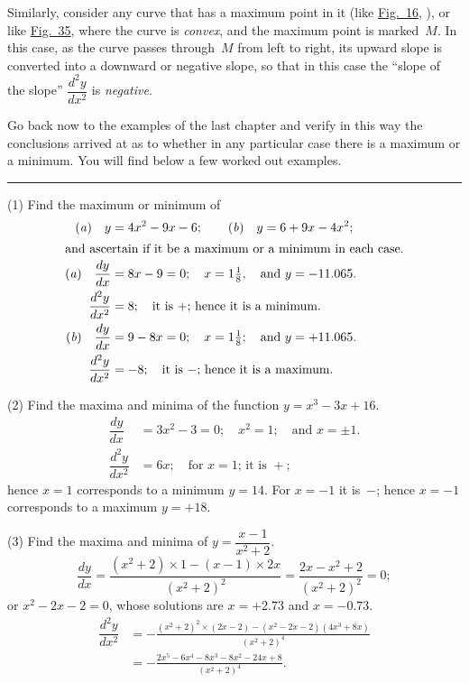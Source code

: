 \documentclass[12pt]{book}[2005/09/16]
\newcommand{\DPPageSep}[2]{\Pagelabel{#2}}
\newcommand{\Pagelabel}[1]
  {\phantomsection\label{#1}}
\newcommand{\Pageref}[2][p.]{%
  \ifthenelse{\not\equal{#1}{}}{%
    \hyperref[#2]{#1~\pageref*{#2}}%
  }{%
    \hyperref[#2]{\pageref{*#2}}%
  }%
}
\newcommand{\Fig}[1]{\hyperref[fig:#1]{Fig.~#1}}
\newcommand{\tb}[1][1.5in]{%
  \pagebreak[0]\par{\centering\rule{#1}{0.5pt}\pagebreak[3]\par}%
}
\newcommand{\DPtypo}[2]{#2}%
\begin{document}
Similarly, consider any curve that has a maximum
point in it (like \Fig{16}, \Pageref{fig:16}), or like \Fig{35}, where %
the curve is \emph{convex}, and the maximum point is
marked~$M$. In this case, as the curve passes through~$M$
from left to right, its upward slope is converted
\DPPageSep{127.png}{115}%
into a downward or negative slope, so that in this
case the ``slope of the slope'' $\dfrac{d^2y}{dx^2}$ is \emph{negative}.

Go back now to the examples of the last chapter
and verify in this way the conclusions arrived at as to
whether in any particular case there is a maximum
or a minimum. You will find below a few worked
out examples.

\tb

(1) Find the maximum or minimum of
\begin{align*}
\text{(\textit{a})}\quad y &= 4x^2-9x-6; \qquad \text{(\textit{b})}\quad y = 6 + 9x-4x^2; \\
\intertext{and ascertain if it be a maximum or a minimum in
each case.}
\text{(\textit{a})}\quad \dfrac{dy}{dx}
  &= 8x-9=0;\quad x=1\tfrac{1}{8},\quad \text{and } y = -11.065.\\
%
\dfrac{d^2y}{dx^2}
  &= 8;\quad \text{it is~$+$; hence it is a minimum.} \\
%
\text{(\textit{b})}\quad \DPtypo{\dfrac{dx}{dy}}{\dfrac{dy}{dx}}
  &= 9-8x=0;\quad x = 1\tfrac{1}{8};\quad \text{and } y = +11.065.\\
%
\dfrac{d^2y}{dx^2}
  &= -8;\quad \text{it is~$-$; hence it is a maximum.}
\end{align*}

(2) Find the maxima and minima of the function
$y = x^3-3x+16$.
\begin{align*}
\dfrac{dy}{dx}
  &= 3x^2 - 3 = 0;\quad x^2 = 1;\quad \text{and } x = ±1.\\
%
\dfrac{d^2y}{dx^2}
  &= 6x;\quad \text{for $x = 1$; it is~$+$};
\end{align*}
hence $x=1$ corresponds to a minimum $y=14$. For
$x=-1$ it is~$-$; hence $x=-1$ corresponds to a maximum
$y=+18$.
\DPPageSep{128.png}{116}%

(3) Find the maxima and minima of $y=\dfrac{x-1}{x^2+2}$.
\[
\frac{dy}{dx} = \frac{(x^2+2) × 1 - (x-1) × 2x}{(x^2+2)^2}
  = \frac{2x - x^2 + 2}{(x^2 + 2)^2} = 0;
\]
or $x^2 - 2x - 2 = 0$, whose solutions are $x =+2.73$ and
$x=-0.73$.
\begin{align*}
\dfrac{d^2y}{dx^2}
  &= - \frac{(x^2 + 2)^2 × (2x-2) - (x^2 - 2x - 2)(4x^3 + 8x)}{(x^2 + 2)^4} \\
  &= - \frac{2x^5 - 6x^4 - 8x^3 - 8x^2 - 24x + 8}{(x^2 + 2)^4}.
\end{align*}
\end{document}
